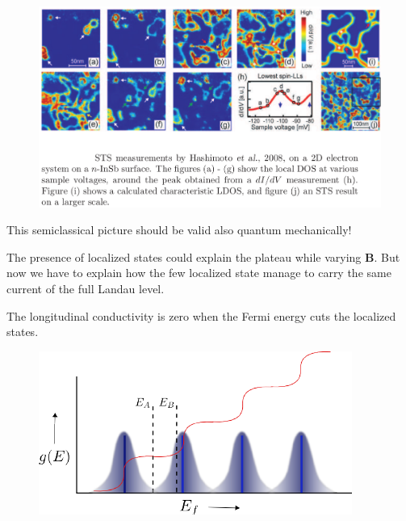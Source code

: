 \documentclass{beamer}
\begin{document}
\begin{frame}
\begin{center}

\begin{figure}[!htb]
\centering
\includegraphics[scale=0.2]{experiment.png}
\end{figure}

\end{center}
\end{frame}%

\begin{frame}
\begin{center}

\begin{block}
\centering
This semiclassical picture should be valid also quantum mechanically!
\centering
\end{block}

The presence of localized states could explain the plateau while varying $\mathbf{B}$. But now we have to explain how the few localized state manage to carry the same current of the full Landau level.

\vspace{10pt}

The longitudinal conductivity is zero when the Fermi energy cuts the localized states.

\begin{figure}[!htb]
\centering
\includegraphics[scale=0.5]{locaized.png}
\end{figure}

\end{center}
\end{frame}
\end{document}
